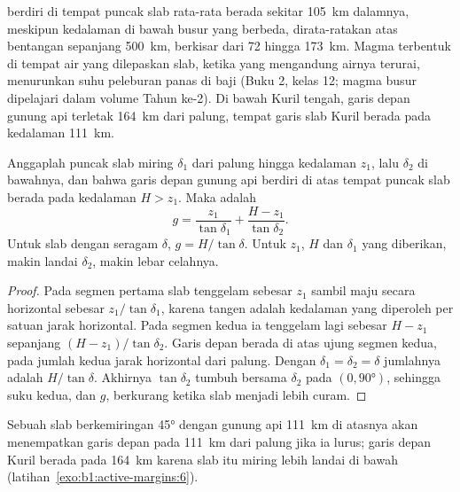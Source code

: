 berdiri di tempat puncak slab rata-rata berada sekitar \qty{105}{km} dalamnya, meskipun kedalaman di bawah busur yang berbeda, dirata-ratakan atas bentangan sepanjang \qty{500}{km}, berkisar dari 72 hingga \qty{173}{km}. Magma terbentuk di tempat air yang dilepaskan slab, ketika  yang mengandung airnya terurai, menurunkan suhu peleburan  panas di baji (Buku 2, kelas 12; magma busur dipelajari dalam volume Tahun ke-2). Di bawah Kuril tengah, garis depan gunung api terletak \qty{164}{km} dari palung, tempat garis slab Kuril berada pada kedalaman \qty{111}{km}.

\begin{proposition}\label{prop:b1:active-margins:gap}
Anggaplah puncak slab miring $\delta_1$ dari palung hingga kedalaman $z_1$, lalu $\delta_2$ di bawahnya, dan bahwa garis depan gunung api berdiri di atas tempat puncak slab berada pada kedalaman $H > z_1$. Maka  adalah
\[
  g = \frac{z_1}{\tan\delta_1} + \frac{H - z_1}{\tan\delta_2} .
\]
Untuk slab dengan  seragam $\delta$, $g = H/\tan\delta$. Untuk $z_1$, $H$
dan $\delta_1$ yang diberikan, makin landai  $\delta_2$, makin lebar celahnya.
\end{proposition}

\begin{proof}
Pada segmen pertama slab tenggelam sebesar $z_1$ sambil maju secara horizontal sebesar
$z_1/\tan\delta_1$, karena tangen  adalah kedalaman yang diperoleh per satuan
jarak horizontal. Pada segmen kedua ia tenggelam lagi sebesar $H - z_1$ sepanjang
$(H - z_1)/\tan\delta_2$. Garis depan berada di atas ujung segmen kedua, pada
jumlah kedua jarak horizontal dari palung. Dengan $\delta_1 = \delta_2
= \delta$ jumlahnya adalah $H/\tan\delta$. Akhirnya $\tan\delta_2$ tumbuh bersama
$\delta_2$ pada $(0, \ang{90})$, sehingga suku kedua, dan $g$, berkurang ketika slab
menjadi lebih curam.
\end{proof}

Sebuah slab berkemiringan \ang{45} dengan gunung api \qty{111}{km} di atasnya akan menempatkan garis depan pada \qty{111}{km} dari palung jika ia lurus; garis depan Kuril berada pada \qty{164}{km} karena slab itu miring lebih landai di bawah  (latihan~\ref{exo:b1:active-margins:6}).

